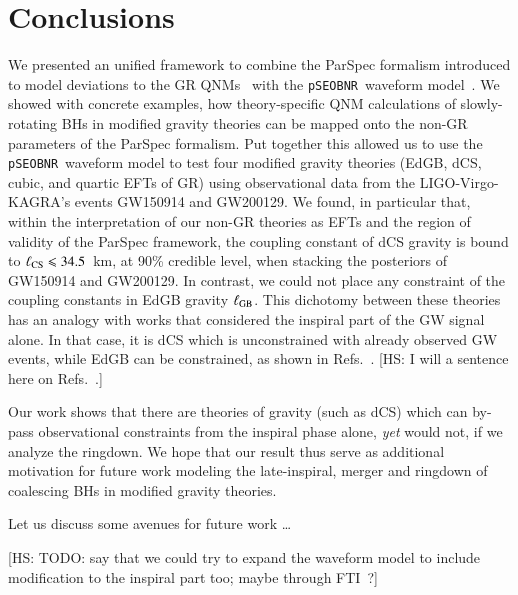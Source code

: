 \documentclass[twocolumn,
               prd,
               aps,
               superscriptaddress,
               tightenlines,
               nofootinbib,
               eqsecnum,
               amsfonts,
               amsmath,
               longbibliography]{revtex4-1}
\newcommand{\pSEOB}{\texttt{pSEOBNR}}
\newcommand{\hs}[1]{{\textcolor{TealBlue}{{#1}}}}
\newcommand{\hscomm}[1]{{\textcolor{TealBlue}{{[HS: #1]}}}}
\begin{document}
\section{Conclusions}
\label{sec:conclusions}


We presented an unified framework to combine the ParSpec formalism introduced
to model deviations to the GR QNMs~\cite{Maselli:2019mjd} with the \pSEOB~waveform model~\cite{Brito:2018rfr,Ghosh:2021mrv}.
%
We showed with concrete examples, how theory-specific QNM calculations of
slowly-rotating BHs in modified gravity theories can be mapped onto the
non-GR parameters of the ParSpec formalism.
%
Put together this allowed us to use the \pSEOB~waveform model to test four
modified gravity theories (EdGB, dCS, cubic, and quartic EFTs of GR) using
observational data from the LIGO-Virgo-KAGRA's events GW150914 and GW200129.
%
We found, in particular that, within the interpretation of our non-GR theories as EFTs and the
region of validity of the ParSpec framework, the coupling constant of dCS gravity is bound to
$\ell_{\rm CS} \leqslant 34.5$~km, at 90\% credible level, when stacking the posteriors
of GW150914 and GW200129.
%
In contrast, we could not place any constraint of the coupling constants in EdGB gravity $\ell_{\rm GB}$.
%
This dichotomy between these theories has an analogy with works that considered
the inspiral part of the GW signal alone.
%
In that case, it is dCS which is unconstrained \hs{with already observed GW
events}, while EdGB can be constrained, as shown in Refs.~\cite{Nair:2019iur,Perkins:2021mhb,Lyu:2022gdr}.
%
\hscomm{I will a sentence here on Refs.~\cite{Alexander:2017jmt,Loutrel:2018ydv,Loutrel:2018rxs}.}

Our work shows that there are theories of gravity (such as dCS) which can by-pass observational
constraints from the inspiral phase alone, {\it yet} would not, if we
analyze the ringdown.
%
We hope that our result thus serve as additional motivation for future work
modeling the late-inspiral, merger and ringdown of coalescing BHs in modified
gravity theories.

Let us discuss some avenues for future work \dots

\hscomm{TODO: say that we could try to expand the waveform model to include modification to
the inspiral part too; maybe through FTI~\cite{Mehta:2022pcn}?}
\end{document}
